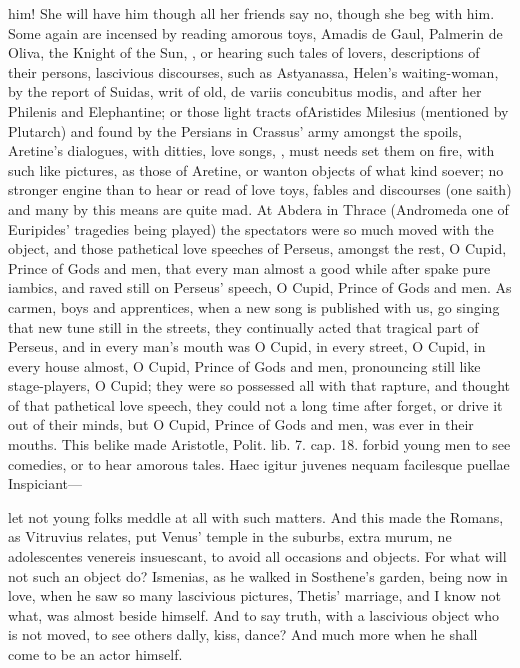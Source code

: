 {him! She will have him though all her friends say no, though she beg
with him. Some again are incensed by reading amorous toys, Amadis de
Gaul, Palmerin de Oliva, the Knight of the Sun, \etc{}, or hearing such
tales of lovers, descriptions of their persons, lascivious
discourses, such as Astyanassa, Helen's waiting-woman, by the report of
Suidas, writ of old, de variis concubitus modis, and after her Philenis
and Elephantine; or those light tracts ofAristides Milesius
(mentioned by Plutarch) and found by the Persians in Crassus' army
amongst the spoils, Aretine's dialogues, with ditties, love songs, \etc{},
must needs set them on fire, with such like pictures, as those of
Aretine, or wanton objects of what kind soever; no stronger engine than
to hear or read of love toys, fables and discourses (one saith)
and many by this means are quite mad. At Abdera in Thrace (Andromeda
one of Euripides' tragedies being played) the spectators were so much
moved with the object, and those pathetical love speeches of Perseus,
amongst the rest, O Cupid, Prince of Gods and men, \etc{} that every man
almost a good while after spake pure iambics, and raved still on
Perseus' speech, O Cupid, Prince of Gods and men. As carmen, boys and
apprentices, when a new song is published with us, go singing that new
tune still in the streets, they continually acted that tragical part of
Perseus, and in every man's mouth was O Cupid, in every street, O
Cupid, in every house almost, O Cupid, Prince of Gods and men,
pronouncing still like stage-players, O Cupid; they were so possessed
all with that rapture, and thought of that pathetical love speech, they
could not a long time after forget, or drive it out of their minds, but
O Cupid, Prince of Gods and men, was ever in their mouths. This belike
made Aristotle, Polit. lib. 7. cap. 18. forbid young men to see
comedies, or to hear amorous tales.
Haec igitur juvenes nequam facilesque puellae
Inspiciant---

let not young folks meddle at all with such matters. And this made the
Romans, as Vitruvius relates, put Venus' temple in the suburbs,
extra murum, ne adolescentes venereis insuescant, to avoid all
occasions and objects. For what will not such an object do? Ismenias,
as he walked in Sosthene's garden, being now in love, when he saw so
many lascivious pictures, Thetis' marriage, and I know not what,
was almost beside himself. And to say truth, with a lascivious object
who is not moved, to see others dally, kiss, dance? And much more when
he shall come to be an actor himself.

}
